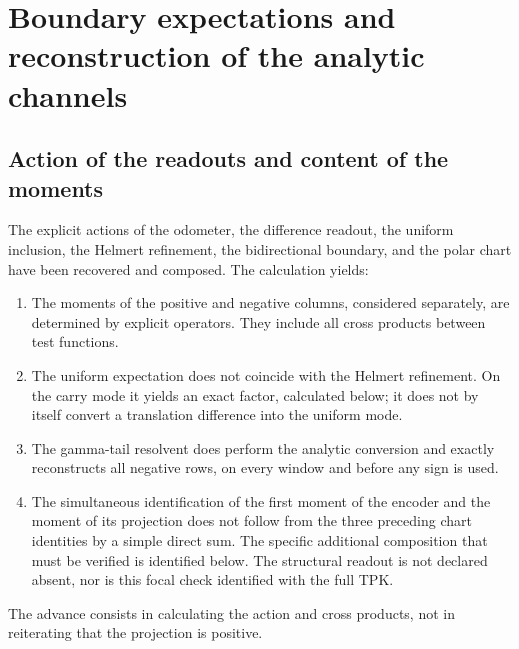 \clearpage
\section[Boundary expectations and reconstruction of the analytic channels]{Boundary expectations and\\reconstruction of the analytic channels}
\label{sec:lectores-gamma}


\subsection{Action of the readouts and content of the moments}
\label{gamma-add-sub-5}

The explicit actions of the odometer, the difference readout, the uniform inclusion, the Helmert refinement, the bidirectional boundary, and the polar chart have been recovered and composed. The calculation yields:

\begin{enumerate}
\item The moments of the positive and negative columns, considered separately, are determined by explicit operators. They include all cross products between test functions.
\item The uniform expectation does not coincide with the Helmert refinement. On the carry mode it yields an exact factor, calculated below; it does not by itself convert a translation difference into the uniform mode.
\item The gamma-tail resolvent does perform the analytic conversion and exactly reconstructs all negative rows, on every window and before any sign is used.
\item The simultaneous identification of the first moment of the encoder and the moment of its projection does not follow from the three preceding chart identities by a simple direct sum. The specific additional composition that must be verified is identified below. The structural readout is not declared absent, nor is this focal check identified with the full TPK.

\end{enumerate}
The advance consists in calculating the action and cross products, not in reiterating that the projection is positive.

